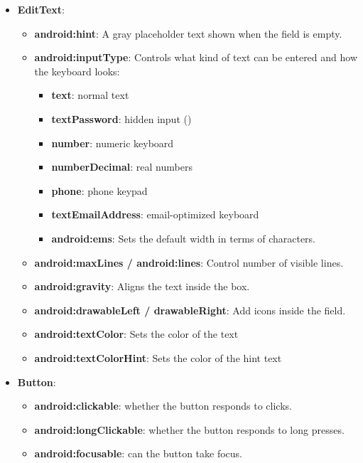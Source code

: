 \documentclass{report}
\begin{document}
\begin{itemize}
\begin{itemize}
            \end{itemize}
        \item \textbf{EditText}: 
            \begin{itemize}
                \item \textbf{android:hint}:  A gray placeholder text shown when the field is empty.
                \item \textbf{android:inputType}:  Controls what kind of text can be entered and how the keyboard looks:
                \begin{itemize}
                    \item \textbf{text}: normal text
                    \item \textbf{textPassword}: hidden input (\bullet\bullet\bullet\bullet)
                    \item \textbf{number}: numeric keyboard
                    \item \textbf{numberDecimal}: real numbers
                    \item \textbf{phone}: phone keypad
                    \item \textbf{textEmailAddress}: email-optimized keyboard
                    \item \textbf{android:ems}: Sets the default width in terms of characters.
                \end{itemize}
                \item \textbf{android:maxLines / android:lines}: Control number of visible lines.
                \item \textbf{android:gravity}: Aligns the text inside the box.
                \item \textbf{android:drawableLeft / drawableRight}: Add icons inside the field.
                \item \textbf{android:textColor}: Sets the color of the text
                \item \textbf{android:textColorHint}: Sets the color of the hint text
            \end{itemize}
        \item \textbf{Button}:
            \begin{itemize}
                \item \textbf{android:clickable}: whether the button responds to clicks.
                \item \textbf{android:longClickable}: whether the button responds to long presses.
                \item \textbf{android:focusable}: can the button take focus.

\end{itemize}
\end{itemize}
\end{document}
